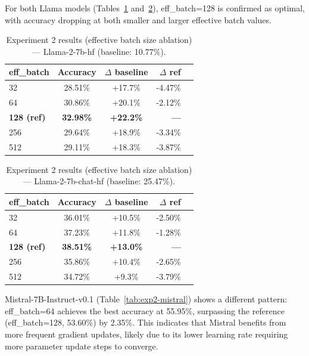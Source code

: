 For both Llama models (Tables~\ref{tab:exp2-llama-hf}
  and~\ref{tab:exp2-llama-chat}), eff\_batch=128 is
  confirmed as optimal, with accuracy dropping at both
  smaller and larger effective batch values.

  \begin{table}[ht]
  \caption{Experiment 2 results (effective batch size ablation) --- Llama-2-7b-hf (baseline: 10.77\%).}
  \centering
  \footnotesize
  \begin{tabular}{lccrr}
  \toprule
  \textbf{eff\_batch} & \textbf{Accuracy} & \textbf{$\Delta$ baseline} & \textbf{$\Delta$ ref} \\
  \midrule
  32  & 28.51\% & +17.7\% & -4.47\% \\
  64  & 30.86\% & +20.1\% & -2.12\% \\
  \textbf{128 (ref)} & \textbf{32.98\%} & \textbf{+22.2\%} & \textbf{---} \\
  256 & 29.64\% & +18.9\% & -3.34\% \\
  512 & 29.11\% & +18.3\% & -3.87\% \\
  \bottomrule
  \end{tabular}

  \label{tab:exp2-llama-hf}
  \end{table}

  \begin{table}[ht]
  \caption{Experiment 2 results (effective batch size ablation) --- Llama-2-7b-chat-hf (baseline: 25.47\%).}
  \centering
  \footnotesize
  \begin{tabular}{lccrr}
  \toprule
  \textbf{eff\_batch} & \textbf{Accuracy} & \textbf{$\Delta$ baseline} & \textbf{$\Delta$ ref} \\
  \midrule
  32  & 36.01\% & +10.5\% & -2.50\% \\
  64  & 37.23\% & +11.8\% & -1.28\% \\
  \textbf{128 (ref)} & \textbf{38.51\%} & \textbf{+13.0\%} & \textbf{---} \\
  256 & 35.86\% & +10.4\% & -2.65\% \\
  512 & 34.72\% & +9.3\%  & -3.79\% \\
  \bottomrule
  \end{tabular}

  \label{tab:exp2-llama-chat}
  \end{table}
  Mistral-7B-Instruct-v0.1 (Table~\ref{tab:exp2-mistral}) shows a
  different pattern: eff\_batch=64 achieves the best accuracy
  at 55.95\%, surpassing the reference (eff\_batch=128,
  53.60\%) by 2.35\%. This indicates that Mistral benefits from more
  frequent gradient updates, likely due to its lower learning rate
  requiring more parameter update steps to converge.

